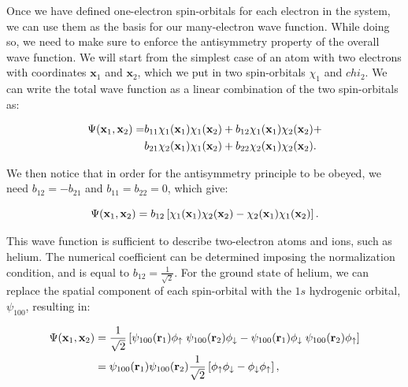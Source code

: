 \documentclass[
  9pt,
]{extbook}
\theoremstyle{definition}
\theoremstyle{definition}
\theoremstyle{definition}
\theoremstyle{remark}
\begin{document}
Once we have defined one-electron spin-orbitals for each electron in the system, we can use them as the basis for our many-electron wave function. While doing so, we need to make sure to enforce the antisymmetry property of the overall wave function. We will start from the simplest case of an atom with two electrons with coordinates \(\mathbf{x}_1\) and \(\mathbf{x}_2\), which we put in two spin-orbitals \(\chi_1\) and \(chi_2\). We can write the total wave function as a linear combination of the two spin-orbitals as:

\begin{equation}
\begin{aligned}
\Psi({\bf x}_1, {\bf x}_2) =& b_{11} \chi_1({\bf x}_1) \chi_1({\bf x}_2) + b_{12} \chi_1({\bf x}_1) \chi_2({\bf x}_2) + \\
& b_{21} \chi_2({\bf x}_1) \chi_1({\bf x}_2) + b_{22} \chi_2({\bf x}_1) \chi_2({\bf x}_2).
\end{aligned}
\label{eq:atom4}
\end{equation}

We then notice that in order for the antisymmetry principle to be obeyed, we need \(b_{12} = -b_{21}\) and \(b_{11} = b_{22} = 0\), which give:

\begin{equation}
\Psi({\bf x}_1, {\bf x}_2) = b_{12} \left[ \chi_1({\bf x}_1) \chi_2({\bf x}_2) - \chi_2({\bf x}_1) \chi_1({\bf x}_2)\right].
\label{eq:atom5}
\end{equation}

This wave function is sufficient to describe two-electron atoms and ions, such as helium. The numerical coefficient can be determined imposing the normalization condition, and is equal to \(b_{12} = \frac{1}{\sqrt{2}}\). For the ground state of helium, we can replace the spatial component of each spin-orbital with the \(1s\) hydrogenic orbital, \(\psi_{100}\), resulting in:

\begin{equation}
\begin{aligned}
\Psi({\bf x}_1, {\bf x}_2) &= \frac{1}{\sqrt{2}} \left[ \psi_{100}({\bf r}_1)\phi_{\uparrow} \; \psi_{100}({\bf r}_2)\phi_{\downarrow} - \psi_{100}({\bf r}_1)\phi_{\downarrow} \; \psi_{100}({\bf r}_2)\phi_{\uparrow} \right] \\
&= \psi_{100}({\bf r}_1)\psi_{100}({\bf r}_2) \frac{1}{\sqrt{2}} \left[ \phi_{\uparrow}\phi_{\downarrow} - \phi_{\downarrow}\phi_{\uparrow} \right],
\end{aligned}
\label{eq:atom6}
\end{equation}
\end{document}
